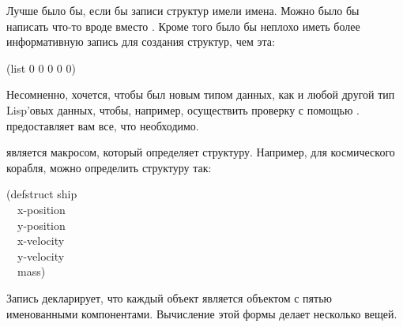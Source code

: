 Лучше было бы, если бы записи структур имели имена. Можно было бы написать что-то
вроде  вместо . Кроме того было
бы неплохо иметь более информативную запись для создания структур, чем эта:
\begin{lisp}
(list 0 0 0 0 0)
\end{lisp}
Несомненно, хочется, чтобы  был новым типом данных, как и любой другой
тип Lisp'овых данных, чтобы, например, осуществить проверку с помощью
.
 предоставляет вам все, что необходимо.

 является макросом, который определяет структуру. Например, для
космического корабля, можно определить структуру так:
\begin{lisp}
(defstruct ship \\
~~x-position \\
~~y-position \\
~~x-velocity \\
~~y-velocity \\
~~mass)
\end{lisp}
Запись декларирует, что каждый объект  является объектом с пятью
именованными компонентами. Вычисление этой формы делает несколько вещей.


